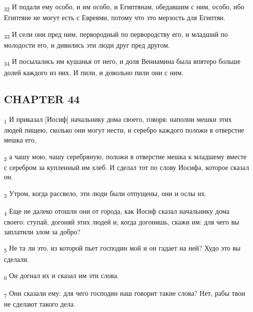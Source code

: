 \begin{tcolorbox}
\textsubscript{32} И подали ему особо, и им особо, и Египтянам, обедавшим с ним, особо, ибо Египтяне не могут есть с Евреями, потому что это мерзость для Египтян.
\end{tcolorbox}
\begin{tcolorbox}
\textsubscript{33} И сели они пред ним, первородный по первородству его, и младший по молодости его, и дивились эти люди друг пред другом.
\end{tcolorbox}
\begin{tcolorbox}
\textsubscript{34} И посылались им кушанья от него, и доля Вениамина была впятеро больше долей каждого из них. И пили, и довольно пили они с ним.
\end{tcolorbox}
\subsection{CHAPTER 44}
\begin{tcolorbox}
\textsubscript{1} И приказал [Иосиф] начальнику дома своего, говоря: наполни мешки этих людей пищею, сколько они могут нести, и серебро каждого положи в отверстие мешка его,
\end{tcolorbox}
\begin{tcolorbox}
\textsubscript{2} а чашу мою, чашу серебряную, положи в отверстие мешка к младшему вместе с серебром за купленный им хлеб. И сделал тот по слову Иосифа, которое сказал он.
\end{tcolorbox}
\begin{tcolorbox}
\textsubscript{3} Утром, когда рассвело, эти люди были отпущены, они и ослы их.
\end{tcolorbox}
\begin{tcolorbox}
\textsubscript{4} Еще не далеко отошли они от города, как Иосиф сказал начальнику дома своего: ступай, догоняй этих людей и, когда догонишь, скажи им: для чего вы заплатили злом за добро?
\end{tcolorbox}
\begin{tcolorbox}
\textsubscript{5} Не та ли это, из которой пьет господин мой и он гадает на ней? Худо это вы сделали.
\end{tcolorbox}
\begin{tcolorbox}
\textsubscript{6} Он догнал их и сказал им эти слова.
\end{tcolorbox}
\begin{tcolorbox}
\textsubscript{7} Они сказали ему: для чего господин наш говорит такие слова? Нет, рабы твои не сделают такого дела.
\end{tcolorbox}
